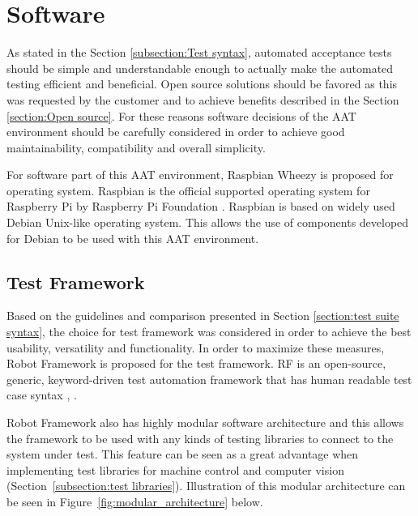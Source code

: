 \section{Software}
\label{section:software}

As stated in the Section \ref{subsection:Test syntax}, automated acceptance tests should be simple and understandable enough to actually make the automated testing efficient and beneficial. Open source solutions should be favored as this was requested by the customer and to achieve benefits described in the Section \ref{section:Open source}. For these reasons software decisions of the AAT environment should be carefully considered in order to achieve good maintainability, compatibility and overall simplicity.

For software part of this AAT environment, Raspbian Wheezy is proposed for operating system. Raspbian is the official supported operating system for Raspberry Pi by Raspberry Pi Foundation \emph{\citep{raspbian}}. Raspbian is based on widely used Debian Unix-like operating system. This allows the use of components developed for Debian to be used with this AAT environment.

\FloatBarrier
\subsection{Test Framework}
\label{subsection:test framework}

Based on the guidelines and comparison presented in Section \ref{section:test suite syntax}, the choice for test framework was considered in order to achieve the best usability, versatility and functionality. In order to maximize these measures, Robot Framework is proposed for the test framework. RF is an open-source, generic, keyword-driven test automation framework that has human readable test case syntax \emph{\citep{Rfuserguide}}, \emph{\citep{robotframework}}.

Robot Framework also has highly modular software architecture \emph{\citep{Rfuserguide}} and this allows the framework to be used with any kinds of testing libraries to connect to the system under test. This feature can be seen as a great advantage when implementing test libraries for machine control and computer vision (Section~\ref{subsection:test libraries}). Illustration of this modular architecture can be seen in Figure~\ref{fig:modular_architecture} below.

